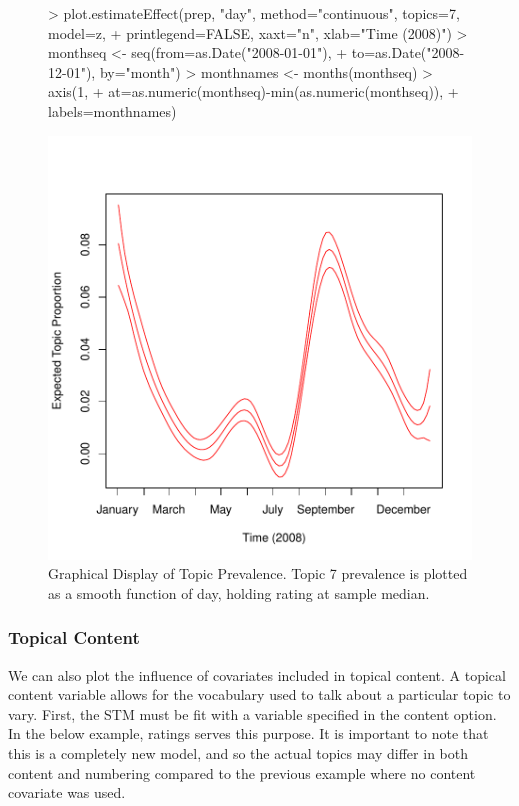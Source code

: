 \documentclass[nojss]{jss}
\begin{document}
\begin{figure}
\begin{center}
\begin{Schunk}
\begin{Sinput}
> plot.estimateEffect(prep, "day", method="continuous", topics=7, model=z,
+ printlegend=FALSE, xaxt="n", xlab="Time (2008)")
> monthseq <- seq(from=as.Date("2008-01-01"), 
+                 to=as.Date("2008-12-01"), by="month")
> monthnames <- months(monthseq)
> axis(1, 
+      at=as.numeric(monthseq)-min(as.numeric(monthseq)), 
+      labels=monthnames)
\end{Sinput}
\end{Schunk}
\includegraphics{stmVignette-016}
\caption{Graphical Display of Topic Prevalence. Topic 7 prevalence is plotted as a smooth function of day, holding rating at sample median.}
\label{fig:spline}
\end{center}
\end{figure}


\subsubsection{Topical Content}
We can also plot the influence of covariates included in topical content. A topical content variable allows for the vocabulary used to talk about a particular topic to vary. First, the STM must be fit with a variable specified in the content option. In the below example, ratings serves this purpose. It is important to note that this is a completely new model, and so the actual topics may differ in both content and numbering compared to the previous example where no content covariate was used.
\end{document}
